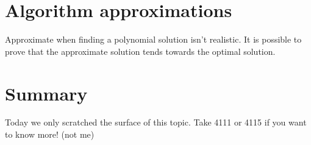 \documentclass[12pt]{book}
\begin{document}
\section*{Algorithm approximations}

Approximate when finding a polynomial solution isn't realistic. It is possible to prove that the approximate solution tends towards the optimal solution.

\section*{Summary}
Today we only scratched the surface of this topic. Take 4111 or 4115 if you want to know more! (not me)
\end{document}
